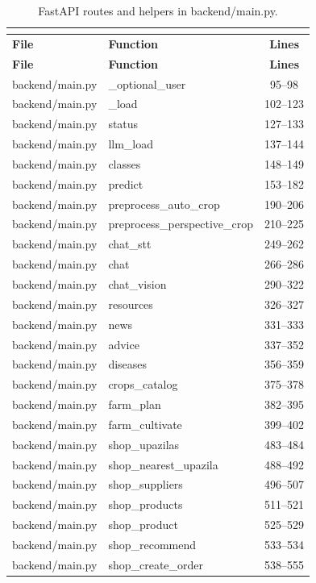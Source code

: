 \begin{center}
\footnotesize
\begin{longtable}{@{}p{4.6cm}p{5.2cm}c@{}}
\caption{FastAPI routes and helpers in backend/main.py.}\\
\label{tab:pyapi}\\
\toprule
\textbf{File} & \textbf{Function} & \textbf{Lines} \\
\midrule
\endfirsthead
\toprule
\textbf{File} & \textbf{Function} & \textbf{Lines} \\
\midrule
\endhead
backend/main.py & \_optional\_user & 95--98 \\
backend/main.py & \_load & 102--123 \\
backend/main.py & status & 127--133 \\
backend/main.py & llm\_load & 137--144 \\
backend/main.py & classes & 148--149 \\
backend/main.py & predict & 153--182 \\
backend/main.py & preprocess\_auto\_crop & 190--206 \\
backend/main.py & preprocess\_perspective\_crop & 210--225 \\
backend/main.py & chat\_stt & 249--262 \\
backend/main.py & chat & 266--286 \\
backend/main.py & chat\_vision & 290--322 \\
backend/main.py & resources & 326--327 \\
backend/main.py & news & 331--333 \\
backend/main.py & advice & 337--352 \\
backend/main.py & diseases & 356--359 \\
backend/main.py & crops\_catalog & 375--378 \\
backend/main.py & farm\_plan & 382--395 \\
backend/main.py & farm\_cultivate & 399--402 \\
backend/main.py & shop\_upazilas & 483--484 \\
backend/main.py & shop\_nearest\_upazila & 488--492 \\
backend/main.py & shop\_suppliers & 496--507 \\
backend/main.py & shop\_products & 511--521 \\
backend/main.py & shop\_product & 525--529 \\
backend/main.py & shop\_recommend & 533--534 \\
backend/main.py & shop\_create\_order & 538--555 \\

\end{longtable}
\end{center}
